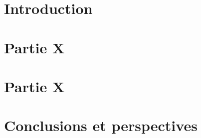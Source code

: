 \documentclass{report}
\begin{document}

\clearpage

%

%

\setcounter{tocdepth}{3} %
\tableofcontents
\listoffigures
\listoftables

\newpage

%

\chapter{Introduction}


\chapter{Partie X}


\chapter{Partie X}


\chapter{Conclusions et perspectives}


\clearpage %


\clearpage
\appendix

\end{document}
